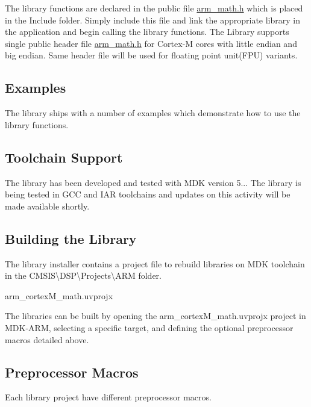 The library functions are declared in the public file {\ttfamily \mbox{\hyperlink{arm__math_8h_source}{arm\+\_\+math.\+h}}} which is placed in the {\ttfamily Include} folder. Simply include this file and link the appropriate library in the application and begin calling the library functions. The Library supports single public header file {\ttfamily  \mbox{\hyperlink{arm__math_8h_source}{arm\+\_\+math.\+h}}} for Cortex-\/M cores with little endian and big endian. Same header file will be used for floating point unit(\+F\+P\+U) variants.

\subsection*{Examples }

The library ships with a number of examples which demonstrate how to use the library functions.

\subsection*{Toolchain Support }

The library has been developed and tested with M\+DK version 5... The library is being tested in G\+CC and I\+AR toolchains and updates on this activity will be made available shortly.

\subsection*{Building the Library }

The library installer contains a project file to rebuild libraries on M\+DK toolchain in the {\ttfamily C\+M\+S\+IS\textbackslash{}D\+SP\textbackslash{}Projects\textbackslash{}A\+RM} folder.
\begin{DoxyItemize}
\item arm\+\_\+cortex\+M\+\_\+math.\+uvprojx
\end{DoxyItemize}

The libraries can be built by opening the arm\+\_\+cortex\+M\+\_\+math.\+uvprojx project in M\+D\+K-\/\+A\+RM, selecting a specific target, and defining the optional preprocessor macros detailed above.

\subsection*{Preprocessor Macros }

Each library project have different preprocessor macros.


